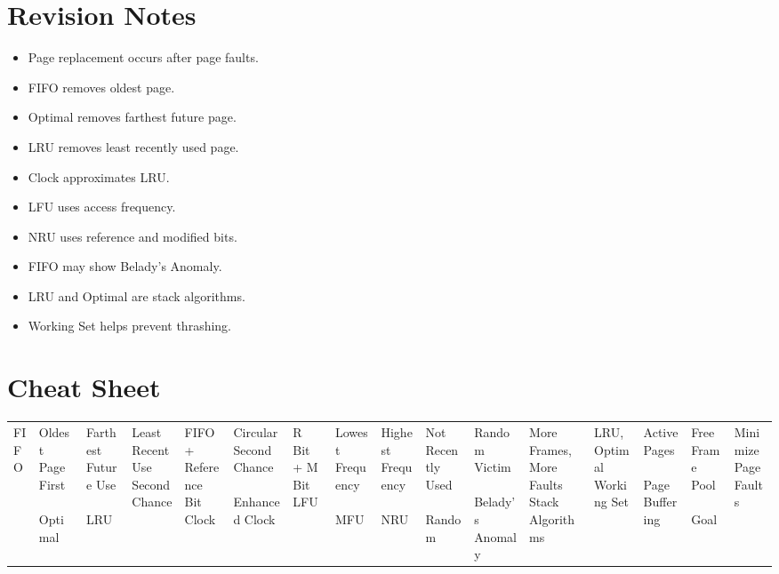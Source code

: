 \section{Revision Notes}

\begin{itemize}
\item Page replacement occurs after page faults.
\item FIFO removes oldest page.
\item Optimal removes farthest future page.
\item LRU removes least recently used page.
\item Clock approximates LRU.
\item LFU uses access frequency.
\item NRU uses reference and modified bits.
\item FIFO may show Belady's Anomaly.
\item LRU and Optimal are stack algorithms.
\item Working Set helps prevent thrashing.
\end{itemize}

\section{Cheat Sheet}

\begin{center}
\begin{tabular}{|p{5cm}|p{8cm}|}
\hline
FIFO & Oldest Page First \
\hline
Optimal & Farthest Future Use \
\hline
LRU & Least Recent Use \
\hline
Second Chance & FIFO + Reference Bit \
\hline
Clock & Circular Second Chance \
\hline
Enhanced Clock & R Bit + M Bit \
\hline
LFU & Lowest Frequency \
\hline
MFU & Highest Frequency \
\hline
NRU & Not Recently Used \
\hline
Random & Random Victim \
\hline
Belady's Anomaly & More Frames, More Faults \
\hline
Stack Algorithms & LRU, Optimal \
\hline
Working Set & Active Pages \
\hline
Page Buffering & Free Frame Pool \
\hline
Goal & Minimize Page Faults \
\hline
\end{tabular}
\end{center}
